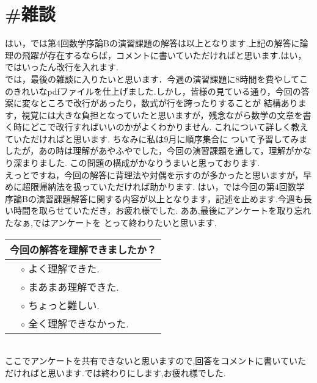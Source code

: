\documentclass{jreport}
\begin{document}
\section{\#雑談}
はい，では第4回数学序論Bの演習課題の解答は以上となります.上記の解答に論理の飛躍が存在するならば，コメントに書いていただければと思います.はい，ではいったん改行を入れます.\\
\indent では，最後の雑談に入りたいと思います．今週の演習課題に8時間を費やしてこのきれいなpdfファイルを仕上げました.しかし，皆様の見ている通り，今回の答案に変なところで改行があったり，数式が行を跨ったりすることが
結構あります，視覚には大きな負担となっていたと思いますが，残念ながら数学の文章を書く時にどこで改行すればいいのかがよくわかりません. これについて詳しく教えていただければと思います. ちなみに私は9月に順序集合に
ついて予習してみましたが，あの時は理解があやふやでした，今回の演習課題を通して，理解がかなり深まりました. この問題の構成がかなりうまいと思っております.\\
えっとですね，今回の解答に背理法や対偶を示すのが多かったと思いますが，早めに超限帰納法を扱っていただければ助かります.
\indent はい，では今回の第4回数学序論Bの演習課題解答に関する内容が以上となります，記述を止めます.今週も長い時間を取らせていただき，お疲れ様でした. ああ,最後にアンケートを取り忘れたなぁ,ではアンケートを
とって終わりたいと思います.\\

\noindent
\begin{tabular}{|p{3cm}p{5cm}p{2cm}|}
\hline
	\multicolumn{3}{|c|}{今回の解答を理解できましたか？}\\
	\hline
		 &$\circ$ よく理解できた.&\\
		&$\circ$ まあまあ理解できた.&\\
		 &$\circ$ ちょっと難しい.&\\
		&$\circ$ 全く理解できなかった.&\\
			\hline
\end{tabular}\\

ここでアンケートを共有できないと思いますので,回答をコメントに書いていただければと思います.では終わりにします,お疲れ様でした.
\end{document}
